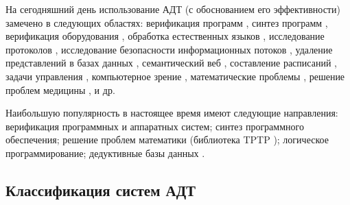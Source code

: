 На сегодняшний день использование АДТ (с обоснованием его эффективности) замечено в следующих областях: верификация программ \cite{promsky,ATP_Ver2,keyproj}, синтез программ \cite{atpsoft, Butakov1}, верификация оборудования \cite{hardver,ACL2}, обработка естественных языков \cite{ATP_NLP}, исследование протоколов \cite{protolan}, исследование безопасности информационных потоков \cite{ATP_Flow}, удаление представлений в базах данных \cite{ATP_DB}, семантический веб \cite{semweb,tptp}, составление расписаний \cite{tptp}, задачи управления \cite{ICDS2000}, компьютерное зрение \cite{ATP_Vision}, математические проблемы \cite{tptp, McCuneRob}, решение проблем медицины \cite{med1, tptp},  и др.

Наибольшую популярность в настоящее время имеют следующие направления: верификация программных и аппаратных систем; синтез программного обеспечения; решение проблем математики (библиотека TPTP \cite{tptp}); логическое программирование; дедуктивные базы данных \cite{ontobox}.


\subsection{Классификация систем АДТ}

